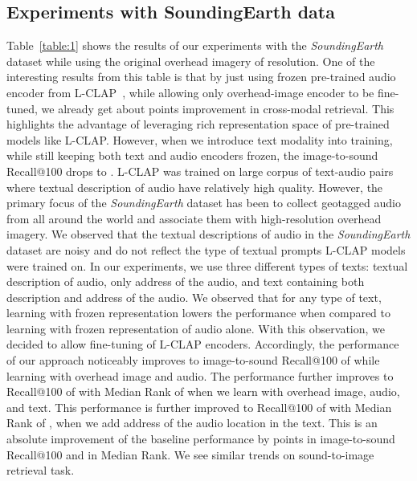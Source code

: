 \documentclass{bmvc2k}
\begin{document}
\subsection{Experiments with SoundingEarth data}
Table~\ref{table:1} shows the results of our experiments with the {\em SoundingEarth} dataset while using the original overhead imagery of  resolution. One of the interesting results from this table is that by just using frozen pre-trained audio encoder from L-CLAP~\cite{laionclap2023}, while allowing only overhead-image encoder to be fine-tuned, we already get about  points improvement in cross-modal retrieval. This highlights the advantage of leveraging rich representation space of pre-trained models like L-CLAP. However, when we introduce text modality into training, while still keeping both text and audio encoders frozen, the image-to-sound Recall@100 drops to . L-CLAP was trained on large corpus of text-audio pairs where textual description of audio have relatively high quality. However, the primary focus of the {\em SoundingEarth} dataset has been to collect geotagged audio from all around the world and associate them with high-resolution overhead imagery. We observed that the textual descriptions of audio in the {\em SoundingEarth} dataset are noisy and do not reflect the type of textual prompts L-CLAP models were trained on. In our experiments, we use three different types of texts: textual description of audio, only address of the audio, and text containing both description and address of the audio. We observed that for any type of text, learning with frozen representation lowers the performance when compared to learning with frozen representation of audio alone. With this observation, we decided to allow fine-tuning of L-CLAP encoders. Accordingly, the performance of our approach noticeably improves to image-to-sound Recall@100 of  while learning with overhead image and audio. The performance further improves to Recall@100 of  with Median Rank of  when we learn with overhead image, audio, and text. 
This performance is further improved to Recall@100 of  with Median Rank of , when we add address of the audio location in the text. This is an absolute improvement of the baseline performance by  points in image-to-sound Recall@100 and  in Median Rank.  We see similar trends on sound-to-image retrieval task.
\end{document}
